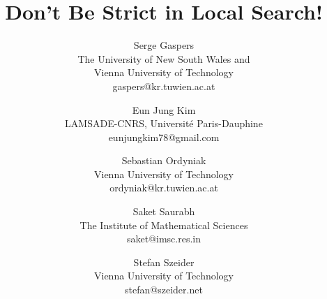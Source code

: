 \documentclass[10pt,usletter]{article}
\begin{document}
\title{Don't Be Strict in Local Search!}

\author{
Serge Gaspers \\
The University of New South Wales and\\
Vienna University of Technology\\
{gaspers@kr.tuwien.ac.at} \\
\and
Eun Jung Kim\\
LAMSADE-CNRS, Universit\'e Paris-Dauphine\\
{eunjungkim78@gmail.com} \\
\and
Sebastian Ordyniak \\
Vienna University of Technology \\
{ordyniak@kr.tuwien.ac.at} \\
\and
Saket Saurabh \\
The Institute of Mathematical Sciences\\
{saket@imsc.res.in}\\
\and
Stefan Szeider \\
Vienna University of Technology \\
{stefan@szeider.net}
}
 




\date{}

\nonfrenchspacing



\maketitle
\end{document}

